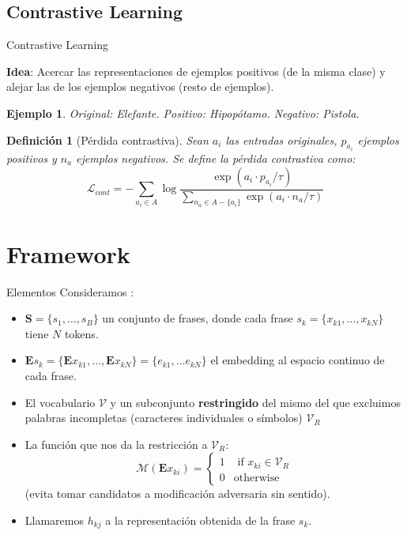 \documentclass[aspectratio=169]{beamer}
\newtheorem{defi}{Definición}
\newtheorem{ex}{Ejemplo}
\begin{document}
  \subsection{Contrastive Learning}

  \begin{frame}{Contrastive Learning}
    
      {\color{Maroon}\textbf{Idea}:} Acercar las representaciones de ejemplos positivos (de la misma clase) y alejar las de los ejemplos negativos (resto de ejemplos).
    

    \begin{ex}
      Original: Elefante. Positivo: Hipopótamo. Negativo: Pistola.
    \end{ex}

    \begin{defi}[Pérdida contrastiva]
      Sean \(a_i\) las entradas originales, \(p_{a_i}\) ejemplos positivos y \(n_{a}\) ejemplos negativos. Se define la pérdida contrastiva como:
      \[
      \mathcal L_{cont} = - \sum_{a_i \in A} \log \frac{\exp(a_i \cdot p_{a_i}/\tau)}{\sum_{n_a \in A - \{ a_i \} } \exp(a_i \cdot n_a / \tau)}  
      \]
    \end{defi}
  \end{frame}


  \section{Framework}

  \begin{frame}{Elementos}
    Consideramos :
    
    \begin{itemize}
    \item  \(\mathbf S = \{s_1,\dots,s_B\}\) un conjunto de frases, donde cada frase \(s_k = \{x_{k1},\dots,x_{kN}\}\) tiene \(N\) tokens.
    \pause
    \item \(\mathbf E s_k = \{\mathbf E x_{k1},\dots, \mathbf E x_{kN}\} = \{e_{k1},\dots e_{kN}\}\) el embedding al espacio continuo de cada frase.
    \pause
    \item El vocabulario \(\mathcal V\) y un subconjunto \textbf{restringido} del mismo del que excluimos palabras incompletas (caracteres individuales o símbolos) \(\mathcal V_R\)
    \pause
    \item La función que nos da la restricción a \(\mathcal V_R\):
    \[
      \mathcal M (\mathbf E x_{ki}) = \begin{cases}1 & \text{ if } x_{ki}\in \mathcal V_R \\ 0 & \text{otherwise}\end{cases}
    \]
    (evita tomar candidatos a modificación adversaria sin sentido).

    \pause
    \item Llamaremos \(h_{kj}\) a la representación obtenida de la frase \(s_k\).

    \end{itemize}
  \end{frame}
\end{document}
